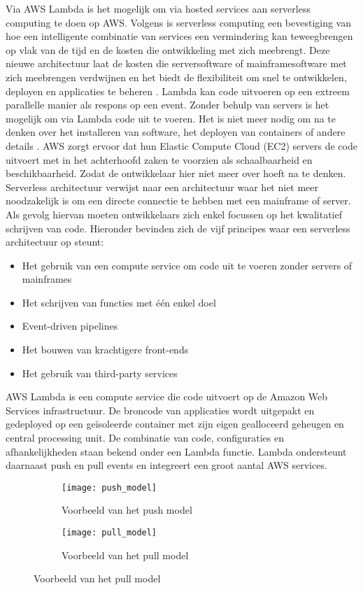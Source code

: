 Via AWS Lambda is het mogelijk om via hosted services aan serverless computing te doen op AWS. Volgens \textcite{Sbarski2017} is serverless computing een bevestiging van hoe een intelligente combinatie van services een vermindering kan teweegbrengen op vlak van de tijd en de kosten die ontwikkeling met zich meebrengt. Deze nieuwe architectuur laat de kosten die serversoftware of mainframesoftware met zich meebrengen verdwijnen en het biedt de flexibiliteit om snel te ontwikkelen, deployen en applicaties te beheren \autocite{Sbarski2017}. Lambda kan code uitvoeren op een extreem parallelle manier als respons op een event. Zonder behulp van servers is het mogelijk om via Lambda code uit te voeren. Het is niet meer nodig om na te denken over het installeren van software, het deployen van containers of andere details \autocite{Sbarski2017}. AWS zorgt ervoor dat hun Elastic Compute Cloud (EC2) servers de code uitvoert met in het achterhoofd zaken te voorzien als schaalbaarheid en beschikbaarheid. Zodat de ontwikkelaar hier niet meer over hoeft na te denken. Serverless architectuur verwijst naar een architectuur waar het niet meer noodzakelijk is om een directe connectie te hebben met een mainframe of server. Als gevolg hiervan moeten ontwikkelaars zich enkel focussen op het kwalitatief schrijven van code. Hieronder bevinden zich de vijf principes waar een serverless architectuur op steunt:
 \begin{itemize}
    \item Het gebruik van een compute service om code uit te voeren zonder servers of mainframes
    \item Het schrijven van functies met één enkel doel
    \item Event-driven pipelines
    \item Het bouwen van krachtigere front-ends
    \item Het gebruik van third-party services
\end{itemize}

AWS Lambda is een compute service die code uitvoert op de Amazon Web Services infrastructuur. De broncode van applicaties wordt uitgepakt en gedeployed op een geïsoleerde container met zijn eigen gealloceerd geheugen en central processing unit. De combinatie van code, configuraties en afhankelijkheden staan bekend onder een Lambda functie. Lambda ondersteunt daarnaast push en pull events en integreert een groot aantal AWS services. 
\begin{figure}[h]
    \centering
    \begin{subfigure}{0.45\textwidth}
        \texttt{[image: push\_model]}
        \caption{Voorbeeld van het push model \autocite{Sbarski2017}}
    \end{subfigure}
    \hfill
    \begin{subfigure}{0.45\textwidth}
        \texttt{[image: pull\_model]}
        \caption{Voorbeeld van het pull model \autocite{Sbarski2017}}
    \end{subfigure}
\end{figure}

